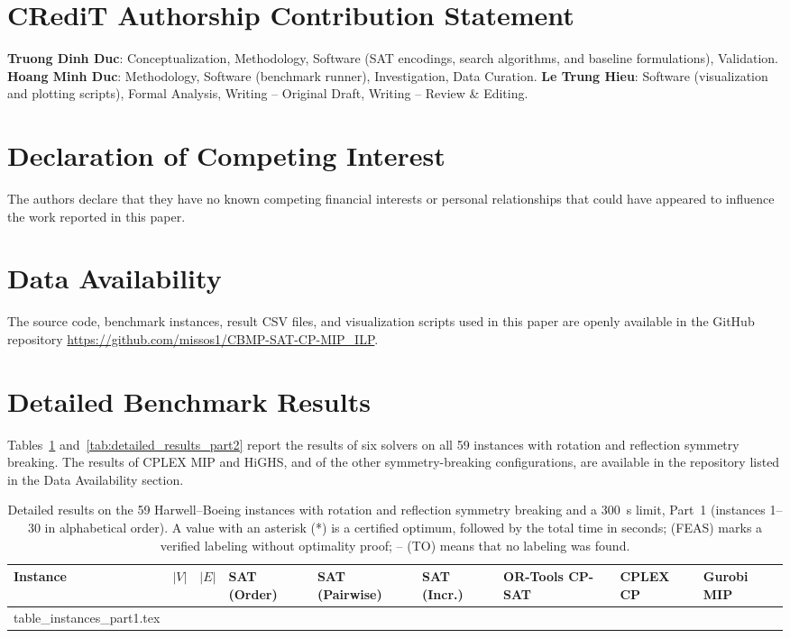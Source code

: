 \documentclass[a4paper,fleqn]{cas-sc}
\makeatletter
\newcommand{\tableinput}[1]{\@@input #1 }
\makeatother
\begin{document}
\section*{CRediT Authorship Contribution Statement}
\textbf{Truong Dinh Duc}: Conceptualization, Methodology, Software (SAT encodings, search algorithms, and baseline formulations), Validation.
\textbf{Hoang Minh Duc}: Methodology, Software (benchmark runner), Investigation, Data Curation.
\textbf{Le Trung Hieu}: Software (visualization and plotting scripts), Formal Analysis, Writing -- Original Draft, Writing -- Review \& Editing.

\section*{Declaration of Competing Interest}
The authors declare that they have no known competing financial interests or personal relationships that could have appeared to influence the work reported in this paper.

\section*{Data Availability}
The source code, benchmark instances, result CSV files, and visualization scripts used in this paper are openly available in the GitHub repository \url{https://github.com/missos1/CBMP-SAT-CP-MIP_ILP}.

\appendix
\section{Detailed Benchmark Results}
\label{app:results}

Tables~\ref{tab:detailed_results_part1} and~\ref{tab:detailed_results_part2} report the results of six solvers on all 59 instances with rotation and reflection symmetry breaking. The results of CPLEX MIP and HiGHS, and of the other symmetry-breaking configurations, are available in the repository listed in the Data Availability section.

\begin{table}[pos=htbp]
\centering
\caption{Detailed results on the 59 Harwell--Boeing instances with rotation and reflection symmetry breaking and a 300~s limit, Part~1 (instances 1--30 in alphabetical order). A value with an asterisk (*) is a certified optimum, followed by the total time in seconds; (FEAS) marks a verified labeling without optimality proof; -- (TO) means that no labeling was found.}
\label{tab:detailed_results_part1}
\scriptsize
\begin{tabular*}{\textwidth}{@{\extracolsep{\fill}}lrrllllll@{}}
\toprule
\textbf{Instance} & \textbf{$|V|$} & \textbf{$|E|$} & \textbf{SAT (Order)} & \textbf{SAT (Pairwise)} & \textbf{SAT (Incr.)} & \textbf{OR-Tools CP-SAT} & \textbf{CPLEX CP} & \textbf{Gurobi MIP} \\
\midrule
\tableinput{table_instances_part1.tex}
\bottomrule
\end{tabular*}
\end{table}
\end{document}
